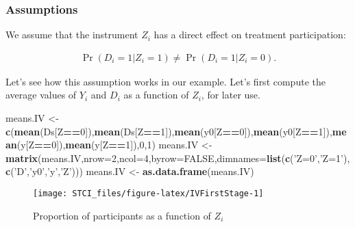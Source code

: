 \documentclass[]{book}
\newenvironment{Shaded}{\begin{snugshade}}{\end{snugshade}}
\newcommand{\DataTypeTok}[1]{\textcolor[rgb]{0.13,0.29,0.53}{#1}}
\newcommand{\DecValTok}[1]{\textcolor[rgb]{0.00,0.00,0.81}{#1}}
\newcommand{\KeywordTok}[1]{\textcolor[rgb]{0.13,0.29,0.53}{\textbf{#1}}}
\newcommand{\NormalTok}[1]{#1}
\newcommand{\OperatorTok}[1]{\textcolor[rgb]{0.81,0.36,0.00}{\textbf{#1}}}
\newcommand{\OtherTok}[1]{\textcolor[rgb]{0.56,0.35,0.01}{#1}}
\newcommand{\StringTok}[1]{\textcolor[rgb]{0.31,0.60,0.02}{#1}}
\theoremstyle{definition}
\theoremstyle{definition}
\theoremstyle{definition}
\theoremstyle{remark}
\let\BeginKnitrBlock\begin \let\EndKnitrBlock\end
\begin{document}
\hypertarget{assumptions}{%
\subsubsection{Assumptions}\label{assumptions}}

\BeginKnitrBlock{definition}[First Stage Full Rank]
\protect\hypertarget{def:FirstStage}{}{\label{def:FirstStage} \iffalse (First Stage Full Rank) \fi{} }We assume that the instrument \(Z_i\) has a direct effect on treatment participation:

\begin{align*}
\Pr(D_i=1|Z_i=1)\neq\Pr(D_i=1|Z_i=0).
\end{align*}
\EndKnitrBlock{definition}

\BeginKnitrBlock{example}
\protect\hypertarget{exm:unnamed-chunk-140}{}{\label{exm:unnamed-chunk-140} }Let's see how this assumption works in our example.
Let's first compute the average values of \(Y_i\) and \(D_i\) as a function of \(Z_i\), for later use.
\EndKnitrBlock{example}

\begin{Shaded}
\begin{Highlighting}[]
\NormalTok{means.IV <-}\StringTok{ }\KeywordTok{c}\NormalTok{(}\KeywordTok{mean}\NormalTok{(Ds[Z}\OperatorTok{==}\DecValTok{0}\NormalTok{]),}\KeywordTok{mean}\NormalTok{(Ds[Z}\OperatorTok{==}\DecValTok{1}\NormalTok{]),}\KeywordTok{mean}\NormalTok{(y0[Z}\OperatorTok{==}\DecValTok{0}\NormalTok{]),}\KeywordTok{mean}\NormalTok{(y0[Z}\OperatorTok{==}\DecValTok{1}\NormalTok{]),}\KeywordTok{mean}\NormalTok{(y[Z}\OperatorTok{==}\DecValTok{0}\NormalTok{]),}\KeywordTok{mean}\NormalTok{(y[Z}\OperatorTok{==}\DecValTok{1}\NormalTok{]),}\DecValTok{0}\NormalTok{,}\DecValTok{1}\NormalTok{)}
\NormalTok{means.IV <-}\StringTok{ }\KeywordTok{matrix}\NormalTok{(means.IV,}\DataTypeTok{nrow=}\DecValTok{2}\NormalTok{,}\DataTypeTok{ncol=}\DecValTok{4}\NormalTok{,}\DataTypeTok{byrow=}\OtherTok{FALSE}\NormalTok{,}\DataTypeTok{dimnames=}\KeywordTok{list}\NormalTok{(}\KeywordTok{c}\NormalTok{(}\StringTok{'Z=0'}\NormalTok{,}\StringTok{'Z=1'}\NormalTok{),}\KeywordTok{c}\NormalTok{(}\StringTok{'D'}\NormalTok{,}\StringTok{'y0'}\NormalTok{,}\StringTok{'y'}\NormalTok{,}\StringTok{'Z'}\NormalTok{)))}
\NormalTok{means.IV <-}\StringTok{ }\KeywordTok{as.data.frame}\NormalTok{(means.IV)}
\end{Highlighting}
\end{Shaded}

\begin{figure}[htbp]

{\centering \texttt{[image: STCI\_files/figure-latex/IVFirstStage-1]} 

}

\caption{Proportion of participants as a function of $Z_i$}\label{fig:IVFirstStage}
\end{figure}
\end{document}
